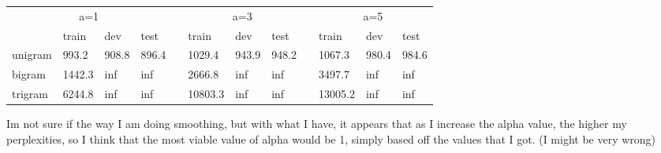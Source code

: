 \documentclass[12pt]{article}
\begin{document}
\begin{table}[!h]
\centering
\begin{tabular}{|llll|l|lll|l|lll|}
\hline
\multicolumn{4}{|c|}{a=1}                                                                        & \multirow{5}{*}{} & \multicolumn{3}{c|}{a=3}                                          & \multirow{5}{*}{} & \multicolumn{3}{c|}{a=5}                                          \\ \cline{1-4} \cline{6-8} \cline{10-12} 
\multicolumn{1}{|l|}{}        & \multicolumn{1}{l|}{train}  & \multicolumn{1}{l|}{dev}   & test  &                   & \multicolumn{1}{l|}{train}   & \multicolumn{1}{l|}{dev}   & test  &                   & \multicolumn{1}{l|}{train}   & \multicolumn{1}{l|}{dev}   & test  \\ \cline{1-4} \cline{6-8} \cline{10-12} 
\multicolumn{1}{|l|}{unigram} & \multicolumn{1}{l|}{993.2}  & \multicolumn{1}{l|}{908.8} & 896.4 &                   & \multicolumn{1}{l|}{1029.4}  & \multicolumn{1}{l|}{943.9} & 948.2 &                   & \multicolumn{1}{l|}{1067.3}  & \multicolumn{1}{l|}{980.4} & 984.6 \\ \cline{1-4} \cline{6-8} \cline{10-12} 
\multicolumn{1}{|l|}{bigram}  & \multicolumn{1}{l|}{1442.3} & \multicolumn{1}{l|}{inf}   & inf   &                   & \multicolumn{1}{l|}{2666.8}  & \multicolumn{1}{l|}{inf}   & inf   &                   & \multicolumn{1}{l|}{3497.7}  & \multicolumn{1}{l|}{inf}   & inf   \\ \cline{1-4} \cline{6-8} \cline{10-12} 
\multicolumn{1}{|l|}{trigram} & \multicolumn{1}{l|}{6244.8} & \multicolumn{1}{l|}{inf}   & inf   &                   & \multicolumn{1}{l|}{10803.3} & \multicolumn{1}{l|}{inf}   & inf   &                   & \multicolumn{1}{l|}{13005.2} & \multicolumn{1}{l|}{inf}   & inf   \\ \hline
\end{tabular}
\end{table}
Im not sure if the way I am doing smoothing, but with what I have, it appears that as I increase the alpha value, the higher my perplexities, so I think that the most viable value of alpha would be 1, simply based off the values that I got. (I might be very wrong)
\newpage
\end{document}
